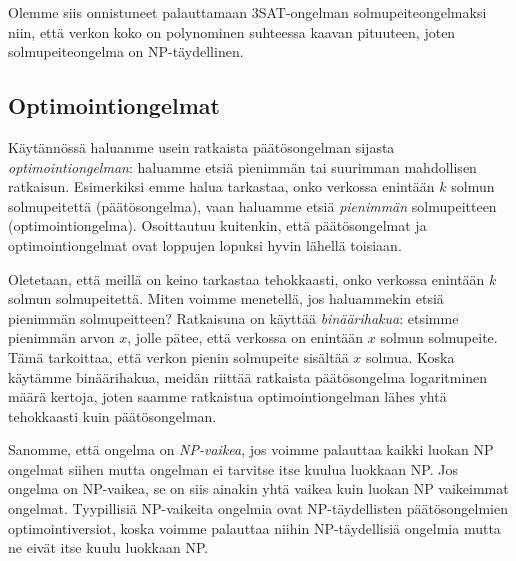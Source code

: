 Olemme siis onnistuneet palauttamaan 3SAT-ongelman solmupeiteongelmaksi
niin, että verkon koko on polynominen suhteessa kaavan pituuteen,
joten solmupeiteongelma on NP-täydellinen.

\subsection{Optimointiongelmat}

Käytännössä haluamme usein ratkaista päätösongelman
sijasta \emph{optimointiongelman}: haluamme etsiä pienimmän
tai suurimman mahdollisen ratkaisun.
Esimerkiksi emme halua tarkastaa, onko verkossa
enintään $k$ solmun solmupeitettä (päätösongelma),
vaan haluamme etsiä \emph{pienimmän} solmupeitteen (optimointiongelma).
Osoittautuu kuitenkin, että päätösongelmat ja optimointiongelmat
ovat loppujen lopuksi hyvin lähellä toisiaan.

Oletetaan, että meillä on keino tarkastaa tehokkaasti,
onko verkossa enin\-tään $k$ solmun solmupeitettä.
Miten voimme menetellä, jos haluammekin etsiä pienimmän
solmupeitteen?
Ratkaisuna on käyttää \emph{binäärihakua}:
etsimme pienimmän arvon $x$, jolle pätee,
että verkossa on enintään $x$ solmun solmupeite.
Tämä tarkoittaa, että verkon pienin solmupeite
sisältää $x$ solmua.
Koska käytämme binäärihakua, meidän riittää ratkaista
päätösongelma logaritminen määrä kertoja,
joten saamme ratkaistua optimointiongelman lähes yhtä
tehokkaasti kuin päätösongelman.

Sanomme, että ongelma on \emph{NP-vaikea}, jos voimme palauttaa
kaikki luokan NP ongelmat siihen mutta ongelman ei
tarvitse itse kuulua luokkaan NP.
Jos ongelma on NP-vaikea, se on siis ainakin yhtä vaikea
kuin luokan NP vaikeimmat ongelmat.
Tyypillisiä NP-vaikeita ongelmia ovat NP-täydellisten
päätösongelmien optimointiversiot,
koska voimme palauttaa niihin NP-täydellisiä ongelmia
mutta ne eivät itse kuulu luokkaan NP.

% 
% 
% 
% 
% 

